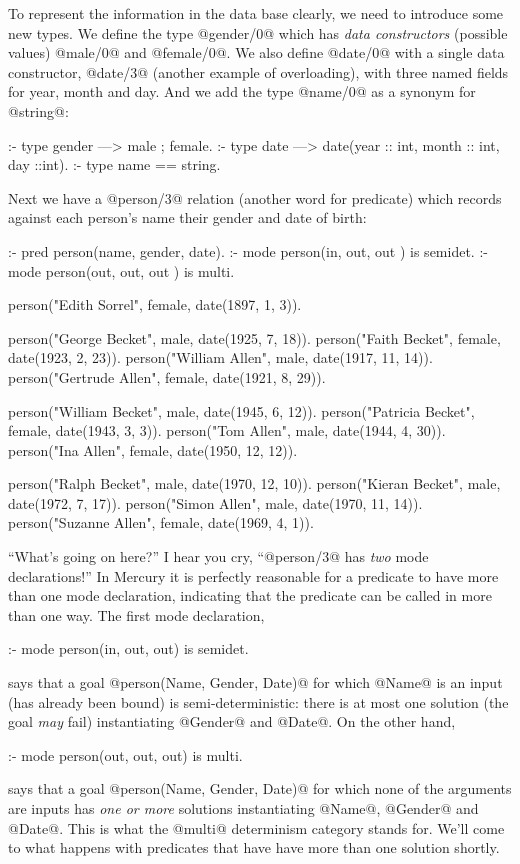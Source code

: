 To represent the information in the data base clearly, we need to introduce
some new types.  We define the type @gender/0@ which has \emph{data
constructors} (\ie possible values) @male/0@ and @female/0@.  We also
define @date/0@ with a single data constructor, @date/3@ (another
example of overloading), with three named fields for year, month and day.
And we add the type @name/0@ as a synonym for @string@:
\begin{myverbatim}
:- type gender ---> male ; female.
:- type date   ---> date(year :: int, month :: int, day ::int).
:- type name   ==   string.
\end{myverbatim}
Next we have a @person/3@ relation (another word for predicate) which
records against each person's name their gender and date of birth:
\begin{myverbatim}
:- pred person(name, gender, date).
:- mode person(in,   out,    out ) is semidet.
:- mode person(out,  out,    out ) is multi.

person("Edith Sorrel",      female, date(1897,  1,  3)).

person("George Becket",     male,   date(1925,  7, 18)).
person("Faith Becket",      female, date(1923,  2, 23)).
person("William Allen",     male,   date(1917, 11, 14)).
person("Gertrude Allen",    female, date(1921,  8, 29)).

person("William Becket",    male,   date(1945,  6, 12)).
person("Patricia Becket",   female, date(1943,  3,  3)).
person("Tom Allen",         male,   date(1944,  4, 30)).
person("Ina Allen",         female, date(1950, 12, 12)).

person("Ralph Becket",      male,   date(1970, 12, 10)).
person("Kieran Becket",     male,   date(1972,  7, 17)).
person("Simon Allen",       male,   date(1970, 11, 14)).
person("Suzanne Allen",     female, date(1969,  4,  1)).
\end{myverbatim}
``What's going on here?'' I hear you cry, ``@person/3@ has \emph{two} mode
declarations!''  In Mercury it is perfectly reasonable for a predicate to
have more than one mode declaration, indicating that the predicate can be
called in more than one way.  The first mode declaration,
\begin{myverbatim}
:- mode person(in, out, out) is semidet.
\end{myverbatim}
says that a goal @person(Name, Gender, Date)@ for which @Name@ is an input
(\ie has already been bound) is semi-deterministic: there is at most one
solution (\ie the goal \emph{may} fail) instantiating @Gender@ and @Date@.
On the other hand,
\begin{myverbatim}
:- mode person(out, out, out) is multi.
\end{myverbatim}
says that a goal @person(Name, Gender, Date)@ for which none of the
arguments are inputs has \emph{one or more} solutions instantiating @Name@,
@Gender@ and @Date@.  This is what the @multi@ determinism category stands
for.  We'll come to what happens with predicates that have have more than
one solution shortly.


